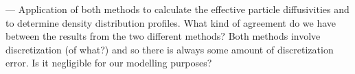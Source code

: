 	
	
	
	---
	Application of both methods to calculate the effective particle diffusivities and to determine density distribution profiles. What kind of agreement do we have between the results from the two different methods? Both methods involve discretization (of what?) and so there is always some amount of discretization error. Is it negligible for our modelling purposes?
	
